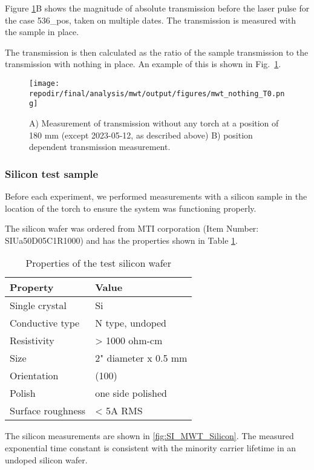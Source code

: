 Figure \ref{fig:SI_MWT_nothing_T0}B shows the magnitude of absolute transmission before the laser pulse for the case 536\_pos, taken on multiple dates. The transmission is measured with the sample in place. %

The transmission is then calculated as the ratio of the sample transmission to the transmission with nothing in place. An example of this is shown in Fig.\ \ref{fig:SI_MWT_nothing_T0}. 


\begin{figure}[]
\centering
\texttt{[image: \\repodir/final/analysis/mwt/output/figures/mwt\_nothing\_T0.png]}
\caption{A) Measurement of transmission without any torch at a position of 180 mm (except 2023-05-12, as described above) B) position dependent transmission measurement.}
\label{fig:SI_MWT_nothing_T0}
\end{figure}

\subsubsection{Silicon test sample}

Before each experiment, we performed measurements with a silicon sample in the location of the torch to ensure the system was functioning properly. 

The silicon wafer was ordered from MTI corporation (Item Number: SIUa50D05C1R1000) and has the properties shown in Table \ref{table:material_properties}.

\begin{table}[h]
\centering
\begin{tabular}{|l|l|}
\hline
Property & Value \\
\hline
Single crystal & Si \\
Conductive type & N type, undoped \\
Resistivity & > 1000 ohm-cm \\
Size & 2" diameter x 0.5 mm \\
Orientation & (100) \\
Polish & one side polished \\
Surface roughness & < 5A RMS \\
\hline
\end{tabular}
\caption{Properties of the test silicon wafer}
\label{table:material_properties}
\end{table}

The silicon measurements are shown in \ref{fig:SI_MWT_Silicon}. The measured exponential time constant is consistent with the minority carrier lifetime in an undoped silicon wafer. \cite{tyagiMINORITYCARRIERRECOMBINATION, delalamoModellingMinoritycarrierTransport1987} %


